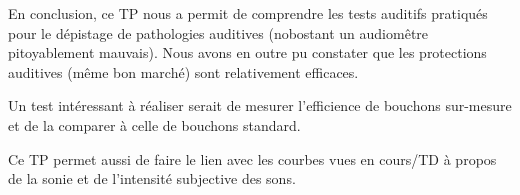 \documentclass[a4paper]{report}
\begin{document}
En conclusion, ce TP nous a permit de comprendre les tests auditifs pratiqués pour le dépistage de pathologies auditives (nobostant un audiomêtre pitoyablement mauvais).
Nous avons en outre pu constater que les protections auditives (même bon marché) sont relativement efficaces.

Un test intéressant à réaliser serait de mesurer l'efficience de bouchons sur-mesure et de la comparer à celle de bouchons standard.

Ce TP permet aussi de faire le lien avec les courbes vues en cours/TD à propos de la sonie et de l'intensité subjective des sons.
\end{document}
